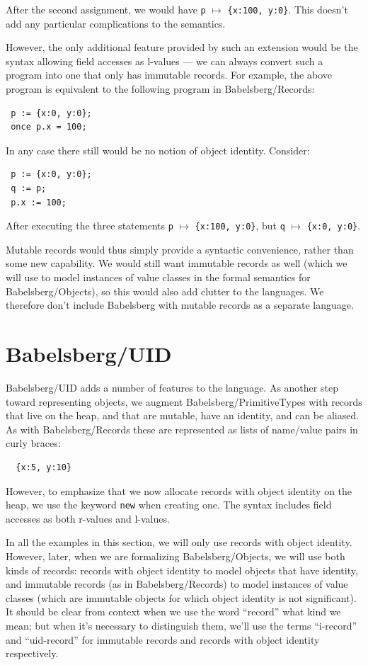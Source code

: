 \documentclass{article}
\begin{document}
After the second assignment, we would have 
\verb|p| $\mapsto$ \verb|{x:100, y:0}|.  This doesn't add any
particular complications to the semantics.

However, the only additional feature provided by such an extension
would be the syntax allowing field accesses as l-values --- we can
always convert such a program into one that only has immutable
records.  For example, the above program is equivalent to the
following program in Babelsberg/Records:
\begin{verbatim}
 p := {x:0, y:0};
 once p.x = 100;
\end{verbatim}

In any case there still would be no notion of object identity.  Consider:
\begin{verbatim}
 p := {x:0, y:0};
 q := p;
 p.x := 100;
\end{verbatim}

After executing the three statements \verb|p| $\mapsto$ \verb|{x:100, y:0}|,
but \verb|q| $\mapsto$ \verb|{x:0, y:0}|.

Mutable records would thus simply provide a syntactic convenience,
rather than some new capability.  We would still want immutable
records as well (which we will use to model instances of value classes
in the formal semantics for Babelsberg/Objects), so this would also
add clutter to the languages.  We therefore don't include Babelsberg
with mutable records as a separate language.

\section{Babelsberg/UID}
\label{sec:babelsberg-uid}

Babelsberg/UID adds a number of features to the language. As another step
toward representing objects, we augment Babelsberg/PrimitiveTypes with
records that live on the heap, and that are mutable, have an identity,
and can be aliased.  As with Babelsberg/Records these are represented
as lists of name/value pairs in curly braces:

\begin{verbatim}
  {x:5, y:10}
\end{verbatim}

However, to emphasize that we now allocate records with object
identity on the heap, we use the keyword \verb|new| when creating
one. The syntax includes field accesses as both r-values and l-values.

In all the examples in this section, we will only use records with
object identity.  However, later, when we are formalizing
Babelsberg/Objects, we will use both kinds of records: records with
object identity to model objects that have identity, and immutable
records (as in Babelsberg/Records) to model instances of value classes
(which are immutable objects for which object identity is not
significant).  It should be clear from context when we use the word
``record'' what kind we mean; but when it's necessary to distinguish
them, we'll use the terms ``i-record'' and ``uid-record'' for
immutable records and records with object identity respectively.
\end{document}
